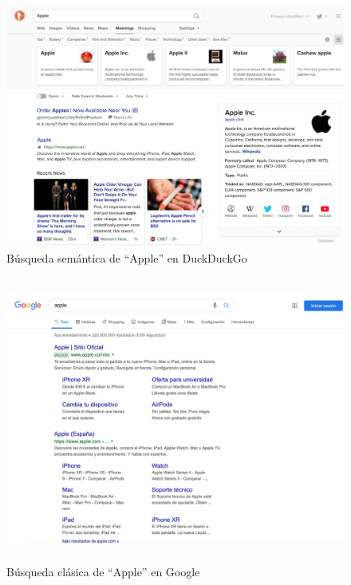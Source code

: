 \begin{figure}[H]
	\centering
	\includegraphics[height=9.cm]{imagenes/capitulo3/duck21}
	\caption{Búsqueda semántica de ``Apple'' en DuckDuckGo}
	\label{busqueda-semantica}
\end{figure}

\begin{figure}[H]
	\centering
	\includegraphics[height=9.4cm]{imagenes/capitulo3/apple}
	\caption{Búsqueda clásica de ``Apple'' en Google}
	\label{busqueda-sintactica}
\end{figure}

